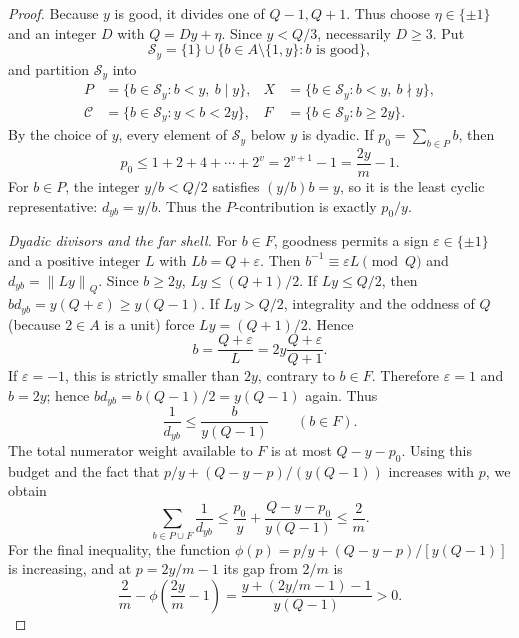 \documentclass[10pt,a4paper]{amsart}
\newcommand{\normQ}[1]{\left\lVert #1\right\rVert_Q}
\begin{document}
\begin{proof}
Because \(y\) is good, it divides one of \(Q-1,Q+1\).  Thus choose
\(\eta\in\{\pm1\}\) and an integer \(D\) with \(Q=Dy+\eta\).  Since
\(y<Q/3\), necessarily \(D\ge3\).  Put
\[
 \mathcal S_y=\{1\}\cup
 \{b\in A\setminus\{1,y\}:b\text{ is good}\},
\]
and partition \(\mathcal S_y\) into
\[
 \begin{aligned}
 P&=\{b\in\mathcal S_y:b<y,\ b\mid y\},&
 X&=\{b\in\mathcal S_y:b<y,\ b\nmid y\},\\
 \mathcal C&=\{b\in\mathcal S_y:y<b<2y\},&
 F&=\{b\in\mathcal S_y:b\ge2y\}.
 \end{aligned}
\]
By the choice of \(y\), every element of \(\mathcal S_y\) below \(y\) is
dyadic.  If \(p_0=\sum_{b\in P}b\), then
\[
 p_0\le1+2+4+\cdots+2^v=2^{v+1}-1=\frac{2y}{m}-1.
\]
For \(b\in P\), the integer \(y/b<Q/2\) satisfies
\((y/b)b=y\), so it is the least cyclic representative:
\(d_{yb}=y/b\).  Thus the \(P\)-contribution is exactly \(p_0/y\).

\smallskip
\noindent\emph{Dyadic divisors and the far shell.}
For \(b\in F\), goodness permits a sign \(\varepsilon\in\{\pm1\}\)
and a positive integer \(L\) with
\(Lb=Q+\varepsilon\).  Then
\(b^{-1}\equiv\varepsilon L\pmod Q\) and
\(d_{yb}=\normQ{Ly}\).  Since \(b\ge2y\),
\(Ly\le(Q+1)/2\).  If \(Ly\le Q/2\), then
\(bd_{yb}=y(Q+\varepsilon)\ge y(Q-1)\).  If \(Ly>Q/2\), integrality
and the oddness of \(Q\) (because \(2\in A\) is a unit) force
\(Ly=(Q+1)/2\).  Hence
\[
 b=\frac{Q+\varepsilon}{L}
   =2y\frac{Q+\varepsilon}{Q+1}.
\]
If \(\varepsilon=-1\), this is strictly smaller than \(2y\), contrary to
\(b\in F\).  Therefore \(\varepsilon=1\) and \(b=2y\); hence
\(bd_{yb}=b(Q-1)/2=y(Q-1)\) again.  Thus
\begin{equation}\label{eq:far-baseline}
 \frac1{d_{yb}}\le\frac{b}{y(Q-1)}\qquad(b\in F).
\end{equation}
The total numerator weight available to \(F\) is at most
\(Q-y-p_0\).  Using this budget and the fact that
\(p/y+(Q-y-p)/(y(Q-1))\) increases with \(p\), we obtain
\begin{equation}\label{eq:P-F}
 \sum_{b\in P\cup F}\frac1{d_{yb}}
 \le\frac{p_0}{y}+\frac{Q-y-p_0}{y(Q-1)}\le\frac2m.
\end{equation}
For the final inequality, the function
\(\phi(p)=p/y+(Q-y-p)/[y(Q-1)]\) is increasing, and at
\(p=2y/m-1\) its gap from \(2/m\) is
\[
 \frac2m-\phi\!\left(\frac{2y}{m}-1\right)
 =\frac{y+(2y/m-1)-1}{y(Q-1)}>0.
\]


\end{proof}
\end{document}
